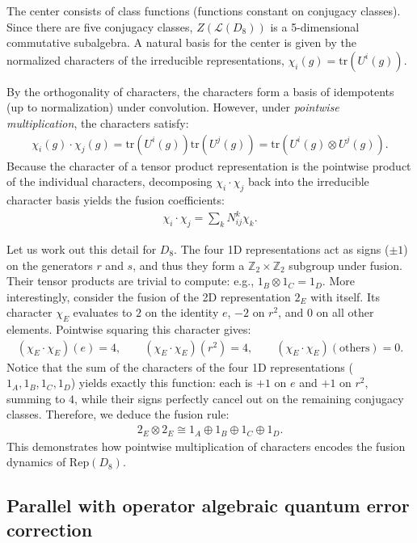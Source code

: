\documentclass[11pt]{article}
\newcommand{\Tr}{\mathrm{tr}}
\begin{document}
The center consists of class functions (functions constant on conjugacy classes). Since there are five conjugacy classes, $Z(\mathcal{L}(D_8))$ is a 5-dimensional commutative subalgebra. A natural basis for the center is given by the normalized characters of the irreducible representations, $\chi_i(g) = \Tr(U^i(g))$.

By the orthogonality of characters, the characters form a basis of idempotents (up to normalization) under convolution. However, under \textit{pointwise multiplication}, the characters satisfy:
\begin{align}
    \chi_i(g) \cdot \chi_j(g) = \Tr(U^i(g)) \Tr(U^j(g)) = \Tr(U^i(g) \otimes U^j(g)).
\end{align}
Because the character of a tensor product representation is the pointwise product of the individual characters, decomposing $\chi_i \cdot \chi_j$ back into the irreducible character basis yields the fusion coefficients:
\begin{align}
    \chi_i \cdot \chi_j = \sum_k N_{ij}^k \chi_k.
\end{align}

Let us work out this detail for $D_8$. The four 1D representations act as signs ($\pm 1$) on the generators $r$ and $s$, and thus they form a $\mathbb{Z}_2 \times \mathbb{Z}_2$ subgroup under fusion. Their tensor products are trivial to compute: e.g., $1_B \otimes 1_C = 1_D$.
More interestingly, consider the fusion of the 2D representation $2_E$ with itself. Its character $\chi_E$ evaluates to $2$ on the identity $e$, $-2$ on $r^2$, and $0$ on all other elements. Pointwise squaring this character gives:
\begin{align}
    (\chi_E \cdot \chi_E)(e) = 4, \qquad (\chi_E \cdot \chi_E)(r^2) = 4, \qquad (\chi_E \cdot \chi_E)(\text{others}) = 0.
\end{align}
Notice that the sum of the characters of the four 1D representations ($1_A, 1_B, 1_C, 1_D$) yields exactly this function: each is $+1$ on $e$ and $+1$ on $r^2$, summing to $4$, while their signs perfectly cancel out on the remaining conjugacy classes. Therefore, we deduce the fusion rule:
\begin{align}
    2_E \otimes 2_E \cong 1_A \oplus 1_B \oplus 1_C \oplus 1_D.
\end{align}
This demonstrates how pointwise multiplication of characters encodes the fusion dynamics of $\mathrm{Rep}(D_8)$.

\subsection{Parallel with operator algebraic quantum error correction}
\end{document}

